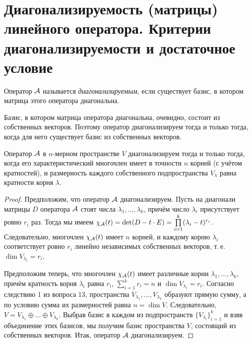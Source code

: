 \section{Диагонализируемость (матрицы) линейного оператора. Критерии диагонализируемости и достаточное условие}

\begin{definition}
    Оператор $\mathcal{A}$ называется \textit{диагонализируемым}, если существует базис, в котором матрица этого оператора диагональна.
\end{definition}

Базис, в котором матрица оператора диагональна, очевидно, состоит из собственных векторов. Поэтому оператор диагонализируем тогда и только тогда, когда для него существует базис из собственных векторов.

\begin{theorem}
    Оператор $\mathcal{A}$ в $n$-мерном пространстве $V$ диагонализируем тогда и только тогда, когда его характеристический многочлен имеет в точности $n$ корней (с учётом кратностей), и размерность каждого собственного подпространства $V_\lambda$ равна кратности корня $\lambda$.
\end{theorem}

\begin{proof}
    Предположим, что оператор $\mathcal{A}$ диагонализируем. Пусть на диагонали матрицы $D$ оператора $\mathcal{A}$ стоят числа $\lambda_1, \ldots, \lambda_k$, причём число $\lambda_i$ присутствует ровно $r_i$ раз. Тогда мы имеем $\chi_{\mathcal{A}}(t) = \det (D - t \cdot E) = \prod\limits_{i = 1}^k(\lambda_i - t)^{r_i}$. Следовательно, многочлен $\chi_{\mathcal{A}}(t)$ имеет $n$ корней, и каждому корню $\lambda_i$ соответствует ровно $r_i$ линейно независимых собственных векторов, т.\,е. $\dim V_{\lambda_i} = r_i$.

    Предположим теперь, что многочлен $\chi_{\mathcal{A}}(t)$ имеет различные корни $\lambda_1, \ldots, \lambda_k$, причём кратность корня $\lambda_i$ равна $r_i$, $\sum\limits_{i = 1}^kr_i = n$ и $\dim V_{\lambda_i} = r_i$. Согласно следствию 1 из вопроса 13, пространства $V_{\lambda_1}, \ldots, V_{\lambda_k}$ образуют прямую сумму, а по условию сумма их размерностей равна $n = \dim V$. Следовательно, $V = V_{\lambda_1} \oplus \ldots \oplus V_{\lambda_k}$. Выбрав базис в каждом из подпространств $\{V_{\lambda_i}\}_{i = 1}^k$ и взяв объединение этих базисов, мы получим базис пространства $V$, состоящий из собственных векторов. Итак, оператор $\mathcal{A}$ диагонализируем.
\end{proof}

